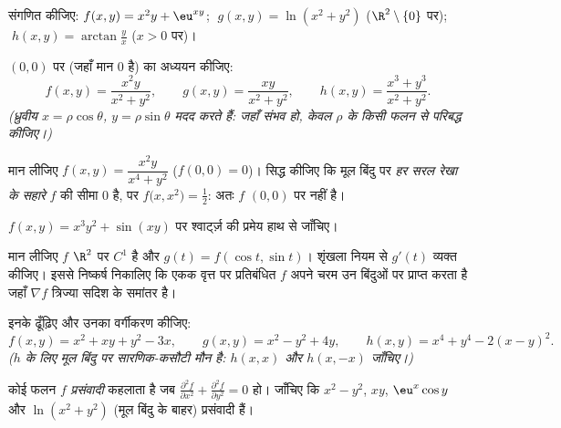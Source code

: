 \begin{exercise}[$\star$]\label{exo:b1:multivar:1}
 संगणित कीजिए:
$f(x,y) = x^2 y + \eu^{xy}$; $\;g(x,y) = \ln(x^2 + y^2)$
($\R^2\setminus\{0\}$ पर); $\;h(x,y) = \arctan\frac yx$ ($x > 0$ पर)।
\end{exercise}

\begin{exercise}[$\star$]\label{exo:b1:multivar:2}
$(0,0)$ पर (जहाँ मान $0$ है)  का अध्ययन कीजिए:
\[
f(x,y) = \frac{x^2 y}{x^2 + y^2},
\qquad
g(x,y) = \frac{xy}{x^2 + y^2},
\qquad
h(x,y) = \frac{x^3 + y^3}{x^2 + y^2}.
\]
\emph{(ध्रुवीय  $x = \rho\cos\theta$, $y = \rho\sin\theta$ मदद
करते हैं: जहाँ संभव हो, केवल $\rho$ के किसी फलन से परिबद्ध कीजिए।)}
\end{exercise}

\begin{exercise}[$\star\star$]\label{exo:b1:multivar:3}
मान लीजिए $f(x,y) = \dfrac{x^2 y}{x^4 + y^2}$ ($f(0,0) = 0$)। सिद्ध कीजिए
कि मूल बिंदु पर \emph{हर सरल रेखा के सहारे} $f$ की सीमा $0$ है, पर
$f\bigl(x, x^2\bigr) = \frac12$: अतः $f$ $(0,0)$ पर  नहीं है।
\end{exercise}

\begin{exercise}[$\star$]\label{exo:b1:multivar:4}
$f(x, y) = x^3 y^2 + \sin(xy)$ पर श्वार्ट्ज़ की प्रमेय हाथ से जाँचिए।
\end{exercise}

\begin{exercise}[$\star\star$]\label{exo:b1:multivar:5}
मान लीजिए $f$ $\R^2$ पर $C^1$ है और $g(t) = f(\cos t, \sin t)$। शृंखला
नियम से $g'(t)$ व्यक्त कीजिए। इससे निष्कर्ष निकालिए कि एकक वृत्त पर
प्रतिबंधित $f$ अपने चरम उन बिंदुओं पर प्राप्त करता है जहाँ $\nabla f$
त्रिज्या सदिश के समांतर है।
\end{exercise}

\begin{exercise}[$\star\star$]\label{exo:b1:multivar:6}
इनके  ढूँढ़िए और उनका वर्गीकरण कीजिए:
\[
f(x, y) = x^2 + xy + y^2 - 3x,
\qquad
g(x, y) = x^2 - y^2 + 4y,
\qquad
h(x, y) = x^4 + y^4 - 2(x - y)^2 .
\]
\emph{($h$ के लिए मूल बिंदु पर सारणिक-कसौटी मौन है: $h(x, x)$ और $h(x,
-x)$ जाँचिए।)}
\end{exercise}

\begin{exercise}[$\star\star$]\label{exo:b1:multivar:7}
कोई फलन $f$ \emph{प्रसंवादी} कहलाता है जब $\frac{\partial^2 f}{\partial
x^2} + \frac{\partial^2 f}{\partial y^2} = 0$ हो। जाँचिए कि $x^2 - y^2$,
$xy$, $\eu^x\cos y$ और $\ln(x^2 + y^2)$ (मूल बिंदु के बाहर) प्रसंवादी हैं।
\end{exercise}

